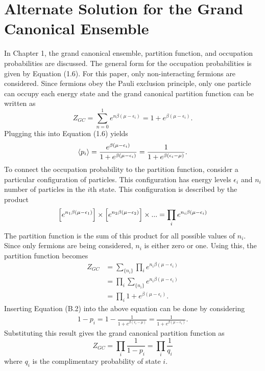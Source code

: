 \chapter{Alternate Solution for the Grand Canonical Ensemble}
In Chapter 1, the grand canonical ensemble, partition function, and occupation probabilities are discussed. The general form for the occupation probabilities is given by Equation (1.6). For this paper, only non-interacting fermions are considered. Since fermions obey the Pauli exclusion principle, only one particle can occupy each energy state and the grand canonical partition function can be written as 
\begin{equation}
    Z_{GC}=\sum_{n=0}^1 e^{n\beta(\mu-\epsilon_i)}=1+e^{\beta(\mu-\epsilon_i)}.
\end{equation}
Plugging this into Equation (1.6) yields
\begin{equation}
    \left<{p_i}\right>=\frac{e^{\beta(\mu-\epsilon_i)}}{1+e^{\beta(\mu-\epsilon_i)}}=\frac{1}{1+e^{\beta(\epsilon_i-\mu)}}.
\end{equation}
To connect the occupation probability to the partition function, consider a particular configuration of particles. This configuration has energy levels $\epsilon_i$ and $n_i$ number of particles in the $i$th state. This configuration is described by the product
\begin{equation}
    \qty[e^{n_1\beta(\mu-\epsilon_1)}]\times\qty[e^{n_2\beta(\mu-\epsilon_2)}]\times...=\prod_i e^{n_i\beta(\mu-\epsilon_i)}
\end{equation}
The partition function is the sum of this product for all possible values of $n_i$. Since only fermions are being considered, $n_i$ is either zero or one. Using this, the partition function becomes
\begin{align}
    Z_{GC}&=\sum_{\{n_i\}}\prod_i e^{n_i\beta(\mu-\epsilon_i)}\nonumber\\
    &=\prod_i\sum_{\{n_i\}} e^{n_i\beta(\mu-\epsilon_i)}\nonumber\\
    &=\prod_i 1+e^{\beta(\mu-\epsilon_i)}.
\end{align}
Inserting Equation (B.2) into the above equation can be done by considering 
\begin{align}
    1-p_i=1-\frac{1}{1+e^{\beta(\epsilon_i-\mu)}}=\frac{1}{1+e^{\beta(\mu-\epsilon_i)}}.
\end{align}
Substituting this result gives the grand canonical partition function as
\begin{equation}
    Z_{GC}=\prod_i\frac{1}{1-p_i}=\prod_i\frac{1}{q_i}
\end{equation}
where $q_i$ is the complimentary probability of state $i$. 